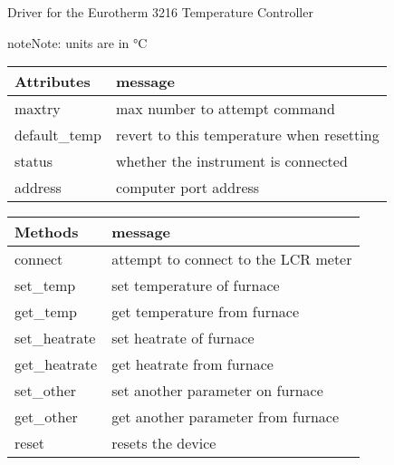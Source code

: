 \documentclass[letterpaper,10pt,english]{sphinxmanual}
\begin{document}
\begin{fulllineitems}
\label{\detokenize{drivers:drivers.Furnace}}
Driver for the Eurotherm 3216 Temperature Controller

\begin{sphinxadmonition}{note}{Note:}
units are in °C
\end{sphinxadmonition}


\begin{savenotes}\sphinxattablestart
\centering
\begin{tabulary}{\linewidth}[t]{|T|T|}
\hline
\sphinxstyletheadfamily 
Attributes
&\sphinxstyletheadfamily 
message
\\
\hline
maxtry
&
max number to attempt command
\\
\hline
default\_temp
&
revert to this temperature when resetting
\\
\hline
status
&
whether the instrument is connected
\\
\hline
address
&
computer port address
\\
\hline
\end{tabulary}
\par
\sphinxattableend\end{savenotes}


\begin{savenotes}\sphinxattablestart
\centering
\begin{tabulary}{\linewidth}[t]{|T|T|}
\hline
\sphinxstyletheadfamily 
Methods
&\sphinxstyletheadfamily 
message
\\
\hline
connect
&
attempt to connect to the LCR meter
\\
\hline
set\_temp
&
set temperature of furnace
\\
\hline
get\_temp
&
get temperature from furnace
\\
\hline
set\_heatrate
&
set heatrate of furnace
\\
\hline
get\_heatrate
&
get heatrate from furnace
\\
\hline
set\_other
&
set another parameter on furnace
\\
\hline
get\_other
&
get another parameter from furnace
\\
\hline
reset
&
resets the device
\\
\hline
\end{tabulary}
\par
\sphinxattableend\end{savenotes}


\end{fulllineitems}
\end{document}
